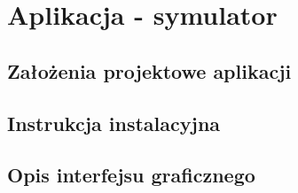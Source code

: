 \chapter{Aplikacja - symulator}
\label{ch:dodatekA-aplikacja}
\section{Założenia projektowe aplikacji}
\section{Instrukcja instalacyjna}
\section{Opis interfejsu graficznego}